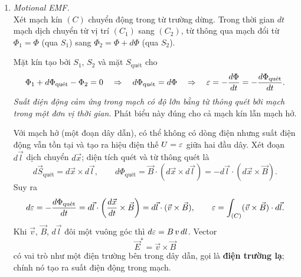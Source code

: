 \begin{enumerate}
\item \textit{Motional EMF.}\\
Xét mạch kín $(C)$ chuyển động trong từ trường dừng. Trong thời gian $dt$ mạch dịch chuyển từ vị trí $(C_1)$ sang $(C_2)$, từ thông qua mạch đổi từ $\Phi_1 = \Phi$ (qua $S_1$) sang $\Phi_2 = \Phi + d\Phi$ (qua $S_2$).
\begin{figure}[htbp]
    \centering
\end{figure}
Mặt kín tạo bởi $S_1$, $S_2$ và mặt $S_{\text{quét}}$ cho
\[
\Phi_1 + d\Phi_{\text{quét}} - \Phi_2 = 0
\quad\Rightarrow\quad
d\Phi_{\text{quét}} = d\Phi
\quad\Rightarrow\quad
\varepsilon = -\frac{d\Phi}{dt} = -\frac{d\Phi_{\text{quét}}}{dt}.
\]
\textit{Suất điện động cảm ứng trong mạch có độ lớn bằng từ thông quét bởi mạch trong một đơn vị thời gian.} Phát biểu này đúng cho cả mạch kín lẫn mạch hở.

Với mạch hở (một đoạn dây dẫn), có thể không có dòng điện nhưng suất điện động vẫn tồn tại và tạo ra hiệu điện thế $U = \varepsilon$ giữa hai đầu dây. Xét đoạn $d\vec{l}$ dịch chuyển $d\vec{x}$; diện tích quét và từ thông quét là
\[
d\vec{S}_{\text{quét}} = d\vec{x} \times d\vec{l},
\qquad
d\Phi_{\text{quét}} = \vec{B}\cdot(d\vec{x} \times d\vec{l}) = -d\vec{l}\cdot(d\vec{x} \times \vec{B}).
\]
Suy ra
\[
d\varepsilon = -\frac{d\Phi_{\text{quét}}}{dt} = d\vec{l}\cdot\left(\frac{d\vec{x}}{dt} \times \vec{B}\right) = d\vec{l}\cdot(\vec{v} \times \vec{B}),
\qquad
\varepsilon = \int_{(C)} (\vec{v} \times \vec{B})\cdot d\vec{l}.
\]
Khi $\vec{v}$, $\vec{B}$, $d\vec{l}$ đôi một vuông góc thì $d\varepsilon = B\,v\,dl$. Vector
\[
\vec{E}^{*} = \vec{v} \times \vec{B}
\]
có vai trò như một điện trường bên trong dây dẫn, gọi là \textbf{điện trường lạ}; chính nó tạo ra suất điện động trong mạch.
\end{enumerate}

